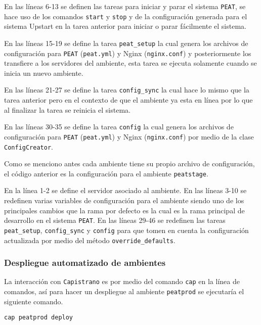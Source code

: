 En las líneas 6-13 se definen las tareas para iniciar y parar el sistema
\texttt{PEAT}, se hace uso de los comandos \texttt{start} y \texttt{stop} y
de la configuración generada para el sistema Upstart en la tarea anterior para
iniciar o parar fácilmente el sistema.

En las líneas 15-19 se define la tarea \texttt{peat\_setup} la cual genera
los archivos de configuración para \texttt{PEAT} (\texttt{peat.yml}) y
Nginx (\texttt{nginx.conf}) y posteriormente los transfiere a los servidores
del ambiente, esta tarea se ejecuta solamente cuando se inicia un nuevo
ambiente.

En las líneas 21-27 se define la tarea \texttt{config\_sync} la cual
hace lo mismo que la tarea anterior pero en el contexto de que el ambiente
ya esta en línea por lo que al finalizar la tarea se reinicia el sistema.

En las líneas 30-35 se define la tarea \texttt{config} la cual genera
los archivos de configuración para \texttt{PEAT} (\texttt{peat.yml}) y
Nginx (\texttt{nginx.conf}) por medio de la clase \texttt{ConfigCreator}.



Como se menciono antes cada ambiente tiene su propio archivo de configuración,
el código anterior es la configuración para el ambiente \texttt{peatstage}.

En la línea 1-2 se define el servidor asociado al ambiente. En las líneas
3-10 se redefinen varias variables de configuración para el ambiente siendo uno
de los principales cambios que la rama por defecto es  la
cual es la rama principal de desarrollo en el sistema \texttt{PEAT}.
En las líneas 29-46 se redefinen las tareas \texttt{peat\_setup},
\texttt{config\_sync} y \texttt{config} para que tomen en cuenta la configuración
actualizada por medio del método \texttt{override\_defaults}.

\subsubsection{Despliegue automatizado de ambientes}

La interacción con \texttt{Capistrano} es por medio del comando \texttt{cap}
en la línea de comandos, así para hacer un despliegue al ambiente \texttt{peatprod}
se ejecutaría el siguiente comando.

\begin{verbatim}
cap peatprod deploy
\end{verbatim}

